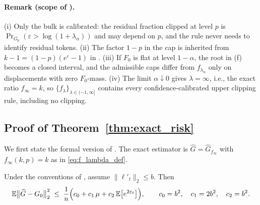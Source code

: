 \paragraph{Remark (scope of ).}
(i) Only the bulk is calibrated: the residual fraction clipped at level $p$ is
$\Pr_{G_p}(\varepsilon>\log(1+\lambda_\alpha))$ and may depend on $p$, and the
rule never needs to identify residual tokens. (ii) The factor $1-p$ in the cap
is inherited from $k-1=(1-p)(e^{\varepsilon}-1)$ in
. (iii) If $F_0$ is flat at level $1-\alpha$, the root
in (f) becomes a closed interval, and the admissible caps differ from
$f_{\lambda_\alpha}$ only on displacements with zero $F_0$-mass. (iv) The limit
$\alpha\downarrow0$ gives $\lambda=\infty$, i.e., the exact ratio $f_\infty=k$,
so $\{f_\lambda\}_{\lambda\in(-1,\infty]}$ contains every confidence-calibrated
upper clipping rule, including no clipping.

\subsection{Proof of Theorem~\ref{thm:exact_risk}}
\label{app:proof_exact_risk}

We first state the formal version of . The exact
estimator is $\widehat G=\widehat G_{f_\infty}$ with $f_\infty(k,p)=k$ as in
\eqref{eq:f_lambda_def}.

\begin{theorem}
\label{thm:exact_risk_formal}
Under the conventions of , assume $\|\ell'_t\|_2\le b$. Then
\begin{equation}
\mathbb{E}\big\|\widehat G-G_0\big\|_2^2
\;\le\;
\frac{1}{n}\Big(c_0+c_1\,\mu+c_2\,\mathbb{E}\big[e^{2\varepsilon_t}\big]\Big),
\qquad
c_0=b^2,\quad c_1=2b^2,\quad c_2=b^2 .
\label{eq:exact_risk_formal}
\end{equation}
\end{theorem}

